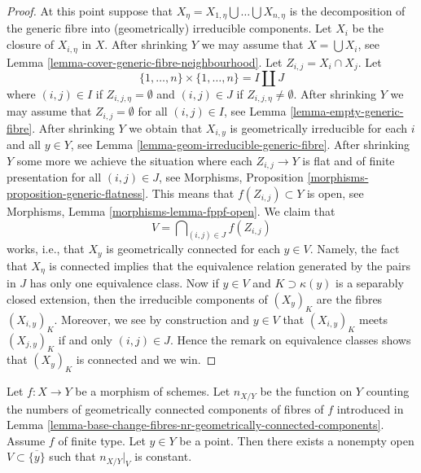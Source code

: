 \begin{proof}
\medskip\noindent
At this point suppose that
$X_\eta = X_{1, \eta} \bigcup \ldots \bigcup X_{n, \eta}$
is the decomposition of the generic fibre into
(geometrically) irreducible components.
Let $X_i$ be the closure of $X_{i, \eta}$ in $X$.
After shrinking $Y$ we may assume that
$X = \bigcup X_i$, see
Lemma \ref{lemma-cover-generic-fibre-neighbourhood}.
Let $Z_{i, j} = X_i \cap X_j$.
Let
$$
\{1, \ldots, n\} \times \{1, \ldots, n\} = I \coprod J
$$
where $(i, j) \in I$ if $Z_{i, j, \eta} = \emptyset$ and
$(i, j) \in J$ if $Z_{i, j, \eta} \not = \emptyset$.
After shrinking $Y$ we may assume that $Z_{i, j} = \emptyset$
for all $(i, j) \in I$, see
Lemma \ref{lemma-empty-generic-fibre}.
After shrinking $Y$ we obtain that $X_{i, y}$
is geometrically irreducible for each $i$ and all $y \in Y$, see
Lemma \ref{lemma-geom-irreducible-generic-fibre}.
After shrinking $Y$ some more we achieve the situation where
each $Z_{i, j} \to Y$ is flat and of finite presentation for
all $(i, j) \in J$, see
Morphisms, Proposition \ref{morphisms-proposition-generic-flatness}.
This means that $f(Z_{i, j}) \subset Y$ is open, see
Morphisms, Lemma \ref{morphisms-lemma-fppf-open}.
We claim that
$$
V  = \bigcap\nolimits_{(i, j) \in J} f(Z_{i, j})
$$
works, i.e., that $X_y$ is geometrically connected for each
$y \in V$. Namely, the fact that $X_\eta$ is connected implies that
the equivalence relation generated by the pairs in $J$ has only
one equivalence class. Now if $y \in V$ and $K \supset \kappa(y)$
is a separably closed extension, then the irreducible components
of $(X_y)_K$ are the fibres $(X_{i, y})_K$. Moreover, we see by
construction and $y \in V$ that $(X_{i, y})_K$ meets $(X_{j, y})_K$
if and only $(i, j) \in J$. Hence the remark on equivalence classes
shows that $(X_y)_K$ is connected and we win.
\end{proof}

\begin{lemma}
\label{lemma-nr-geom-connected-components-good}
Let $f : X \to Y$ be a morphism of schemes. Let
$n_{X/Y}$ be the function on $Y$ counting the numbers of geometrically
connected components of fibres of $f$ introduced in
Lemma \ref{lemma-base-change-fibres-nr-geometrically-connected-components}.
Assume $f$ of finite type.
Let $y \in Y$ be a point. Then there exists a nonempty open
$V \subset \overline{\{y\}}$ such that $n_{X/Y}|_V$ is constant.
\end{lemma}

